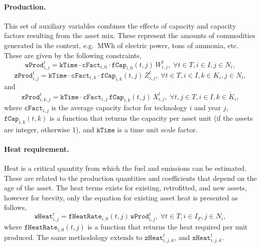 \documentclass{amsart}
\begin{document}
\paragraph{Production.}
%
This set of auxiliary variables
combines the effects of capacity and capacity factors resulting from the asset
mix. These represent the amounts of commodities generated in the context, e.g.\
MWh of electric power, tons of ammonia, etc. These are given by the following
constraints,
%
% 
%
\begin{equation}
    \mathtt{wProd}^t_{i,j} = 
    \mathtt{kTime} \cdot 
    \mathtt{cFact}_{i,0} \cdot
    \mathtt{fCap}_{i,0}\left(t,j\right) \,
    W^t_{i,j},
    \; \forall t \in T, i \in I, j \in N_i,
\end{equation}
\begin{equation}
    \mathtt{zProd}^t_{i,j} = 
    \mathtt{kTime} \cdot 
    \mathtt{cFact}_{i,k} \cdot
    \mathtt{fCap}_{i,k}\left(t,j\right) \,
    Z^t_{i,j},
    \; \forall t \in T, i \in I, k\in K_i, j \in N_i,
    \label{eq:zprod}
\end{equation}
and
%
\begin{equation}
    \mathtt{xProd}^t_{i,k,j} = 
    \mathtt{kTime} \cdot 
    \mathtt{cFact}_{i,j}\, 
    \mathtt{fCap}_{i,k}\left(t,j\right) \,
    X^t_{i,j}
    ,\; \forall 
    t,j \in T, i \in I, k \in \tilde{K}_i,
\end{equation}
%
where $\mathtt{cFact}_{i,j}$ is the average capacity factor for technology $i$
and year $j$, $\mathtt{fCap}_{i,k}\left(t,k\right)$ is a function that returns
the capacity per asset unit (if the assets are integer, otherwise 1), 
and $\mathtt{kTime}$ is a time unit scale factor. 

%
\paragraph{Heat requirement.}
Heat is a critical quantity from which the fuel and emissions can be estimated.
These are related to the production quantities and coefficients that depend on
the age of the asset. 
The heat terms exists for existing, retrofitted, and new assets, however for
brevity, only the equation for existing asset heat is presented as follows, 
%
\begin{equation}
    \mathtt{wHeat}^t_{i,j} = \mathtt{fHeatRate}_{i,0}\! \left(t,j\right)\,
    \mathtt{wProd}^t_{i,j},
    \; \forall t \in T, i \in I_F, j \in N_i,
    \label{eq:fhr}
\end{equation}
%
where $\mathtt{fHeatRate}_{i,0}\! \left(t,j\right)$ is a function that returns
the heat required per unit produced. The same methodology extends to
$\mathtt{zHeat}^t_{i,j,k}$, and $\mathtt{xHeat}^t_{i,j,k}$. 
\end{document}
